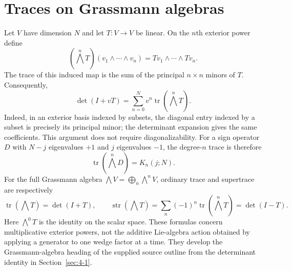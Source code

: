 \section{Traces on Grassmann algebras}
\label{sec:4-2}
Let $V$ have dimension $N$ and let $T:V\to V$ be linear. On the $n$th exterior power define
\[
(\bigwedge^n T)(v_1\wedge\cdots\wedge v_n)
=Tv_1\wedge\cdots\wedge Tv_n.
\]
The trace of this induced map is the sum of the principal $n\times n$ minors of $T$. Consequently,
\begin{equation}\label{eq:exterior-trace-determinant}
\det(I+vT)=\sum_{n=0}^N v^n\operatorname{tr}(\bigwedge^n T).
\end{equation}
Indeed, in an exterior basis indexed by subsets, the diagonal entry indexed by a subset is precisely its principal minor; the determinant expansion gives the same coefficients. This argument does not require diagonalizability.
For a sign operator $D$ with $N-j$ eigenvalues $+1$ and $j$ eigenvalues $-1$, the degree-$n$ trace is therefore
\[
\operatorname{tr}(\bigwedge^n D)=K_n(j;N).
\]
For the full Grassmann algebra $\bigwedge V=\bigoplus_n\bigwedge^n V$, ordinary trace and supertrace are respectively
\[
\operatorname{tr}(\bigwedge T)=\det(I+T),\qquad
\operatorname{str}(\bigwedge T)=\sum_n(-1)^n\operatorname{tr}(\bigwedge^n T)=\det(I-T).
\]
Here $\bigwedge^0T$ is the identity on the scalar space. These formulas concern multiplicative exterior powers, not the additive Lie-algebra action obtained by applying a generator to one wedge factor at a time. They develop the Grassmann-algebra heading of the supplied source outline from the determinant identity in Section~\ref{sec:4-1}.

